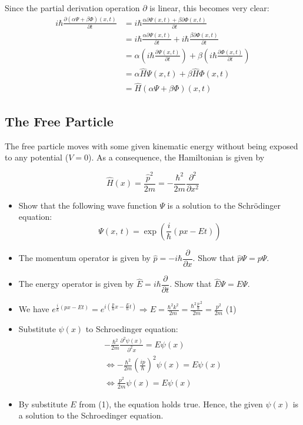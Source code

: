 \documentclass{article}
\begin{document}
  Since the partial derivation operation $\partial$ is linear, this becomes very clear:
  \begin{align*}
      i\hbar \frac{\partial\left(\alpha\Psi + \beta\Phi\right)(x, t)}{\partial t} &= i\hbar \frac{\alpha\partial\Psi(x, t)+\beta\partial\Phi(x, t)}{\partial t}\\
      &= i\hbar \frac{\alpha\partial\Psi(x, t)}{\partial t} + i\hbar \frac{\beta\partial\Phi(x, t)}{\partial t}\\
      &= \alpha \left(i\hbar \frac{\partial\Psi(x, t)}{\partial t}\right) + \beta \left(i\hbar \frac{\partial\Phi(x, t)}{\partial t}\right)\\
      &= \alpha \hat{H}\Psi(x, t) + \beta \hat{H}\Phi(x, t)\\
      &= \hat{H}(\alpha\Psi + \beta\Phi)(x, t)
  \end{align*}

  \subsection{The Free Particle}
  \begin{centerframebox}
    The free particle moves with some given kinematic energy without being exposed to any potential
    ($V = 0$). As a consequence, the Hamiltonian is given by

    \[ \hat{H}(x) = \frac{\hat{p}^2}{2m} = -\frac{\hbar^2}{2m}\frac{\partial^2}{\partial x^2} \]

    \begin{itemize}
      \item Show that the following wave function $\Psi$ is a solution to the Schrödinger equation:
      \[ \Psi(x,\, t) = \exp\left(\frac{i}{\hbar} (px-Et)\right) \]
      \item The momentum operator is given by $\hat{p} = -i\hbar\dfrac{\partial}{\partial x}$. Show that $\hat{p}\Psi = p\Psi$.
      \item The energy operator is given by $\hat{E} = i\hbar\dfrac{\partial}{\partial t}$. Show that $\hat{E}\Psi = E\Psi$.
    \end{itemize}
  \end{centerframebox}
  \begin{itemize}
    \item[] We have
        $e^{\frac{i}{\hbar}(px-Et)} = e^{i(\frac{p}{\hbar}x-\frac{E}{\hbar}t)} \Rightarrow E = \frac{\hbar^2k^2}{2m} = \frac{\hbar^2\frac{p}{\hbar}^2}{2m} = \frac{p^2}{2m}$ (1)
    \item[] Substitute $\psi(x)$ to Schroedinger equation:
    \begin{align*}
        &-\frac{\hbar^2}{2m}\frac{\partial^2 \psi(x)}{\partial^2 x} = E\psi(x)\\
        &\Leftrightarrow -\frac{\hbar^2}{2m}(\frac{ip}{\hbar})^2\psi(x) = E\psi(x)\\
        &\Leftrightarrow \frac{p^2}{2m}\psi(x) = E\psi(x) \label{eq}
    \end{align*}
    \item[] By substitute $E$ from (1), the equation holds true. Hence, the given $\psi(x)$ is a solution to the Schroedinger equation.
  \end{itemize}
\end{document}
